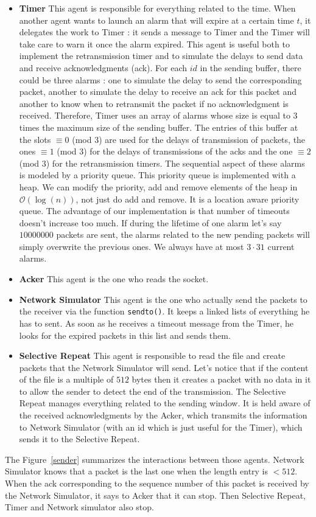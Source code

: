 \documentclass[10pt,a4paper]{article}
\begin{document}
\begin{itemize}
\item \textbf{Timer} This agent is responsible for everything related to the time. When another agent wants to launch an alarm that will expire at a certain time $t$, it delegates the work to Timer : it sends a message to Timer and the Timer will take care to warn it once the alarm expired. This agent is useful both to implement the retransmission timer and to simulate the delays to send data and receive acknowledgments (ack). For each $id$ in the sending buffer, there could be three alarms : one to simulate the delay to send the corresponding packet, another to simulate the delay to receive an ack for this packet and another to know when to retransmit the packet if no acknowledgment is received. Therefore, Timer uses an array of alarms whose size is equal to 3 times the maximum size of the sending buffer. The entries of this buffer at the slots $\equiv 0$ (mod $3$) are used for the delays of transmission of packets, the ones $\equiv 1$ (mod $3$) for the delays of transmissions of the acks and the one $\equiv 2$ (mod $3$) for the retransmission timers. The sequential aspect of these alarms is modeled by a priority queue. This priority queue is implemented with a heap. We can modify the priority, add and remove elements of the heap in $\mathcal{O}(\log(n))$, not just do add and remove. It is a location aware priority queue. The advantage of our implementation is that number of timeouts doesn't increase too much. If during the lifetime of one alarm let's say $10000000$ packets are sent, the alarms related to the new pending packets will simply overwrite the previous ones. We always have at most $3 \cdot 31$ current alarms.
\item \textbf{Acker} This agent is the one who reads the socket.
\item \textbf{Network Simulator} This agent is the one who actually send the packets to the receiver via the function \texttt{sendto()}. It keeps a linked lists of everything he has to sent. As soon as he receives a timeout message from the Timer, he looks for the expired packets in this list and sends them.
\item \textbf{Selective Repeat}  This agent is responsible to read the file and create packets that the Network Simulator will send. Let's notice that if the content of the file is a multiple of $512$ bytes then it creates a packet with no data in it to allow the sender to detect the end of the transmission. The Selective Repeat manages everything related to the sending window. It is held aware of the received acknowledgments by the Acker, which transmits the information to Network Simulator (with an id which is just useful for the Timer), which sends it to the Selective Repeat.
\end{itemize}
The Figure~\ref{sender} summarizes the interactions between those agents. Network Simulator knows that a packet is the last one when the length entry is $< 512$. When the ack corresponding to the sequence number of this packet is received by the Network Simulator, it says to Acker that it can stop. Then Selective Repeat, Timer and Network simulator also stop.
\end{document}
